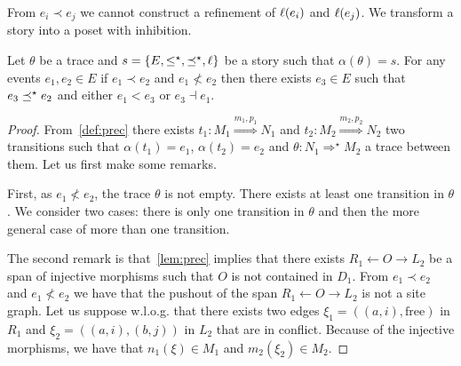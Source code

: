 From $e_i \prec e_j$ we cannot construct a refinement of $\ell(e_i)$ and $\ell(e_j)$. We transform a story into a poset with inhibition.

\begin{lemma}
  Let $\theta$ be a trace and $s=\{E,\leq^{\star},\preceq^{\star},\ell\}$ be a story such that $\alpha(\theta) = s$. For any events $e_1,e_2\in E$ if $e_1\prec e_2$ and $e_1\not< e_2$ then there exists $e_3\in E$ such that $e_3\preceq^{\star} e_2$ and either $e_1< e_3$ or $e_3\dashv e_1$.
\end{lemma}
\begin{proof}
  From~\autoref{def:prec} there exists $t_1:M_1\overset{m_1,p_1}{\Rightarrow} N_1$ and $t_2:M_2\overset{m_2,p_2}{\Rightarrow} N_2$ two transitions such that $\alpha(t_1)=e_1$, $\alpha(t_2)=e_2$ and $\theta:N_1\Rightarrow^{\star}M_2$ a trace between them. Let us first make some remarks.

  First, as $e_1\not< e_2$, the trace $\theta$ is not empty. There exists at least one transition in $\theta$. We consider two cases: there is only one transition in $\theta$ and then the more general case of more than one transition.

  The second remark is that~\autoref{lem:prec} implies that there exists $R_1\leftarrow O\rightarrow L_2$ be a span of injective morphisms such that $O$ is not contained in $D_1$. From $e_1\prec e_2$ and $e_1\not< e_2$ we have that the pushout of the span $R_1\leftarrow O\rightarrow L_2$ is not a site graph. Let us suppose w.l.o.g. that there exists two edges $\xi_1=((a,i), \text{free})$ in $R_1$ and $\xi_2=((a,i),(b,j))$ in $L_2$ that are in conflict. Because of the injective morphisms, we have that $n_1(\xi) \in M_1$ and $m_2(\xi_2)\in M_2$.


\end{proof}
